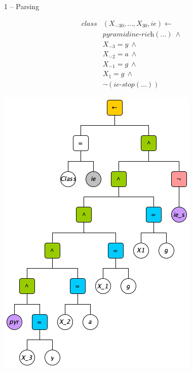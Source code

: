 \documentclass[presentation]{beamer}\mode<presentation>{\usetheme{AMSBolognaFC}}
\begin{document}
\begin{frame}{1 -- Parsing}
    
    \begin{minipage}{0.5\textwidth}
        \begin{equation*}
            \begin{split}
                class&(X_{-30}, \dots, X_{30}, ie) \leftarrow\\
                &\textit{pyramidine-rich}(\dots)\ \wedge\\
                &X_{-3} = y\ \wedge\\
                &X_{-2} = a\ \wedge\\
                &X_{-1} = g\ \wedge\\
                &X_{1} = g\ \wedge\\
                &\neg(\textit{ie-stop}(\dots)) 
            \end{split}
        \end{equation*}
    \end{minipage}
    \noindent\begin{minipage}{0.4\textwidth}%
        \includegraphics[width=\linewidth]{figures/ast-ie-1.png}
    \end{minipage}%
    
    
\end{frame}
\end{document}
